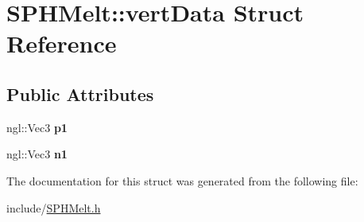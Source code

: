 \hypertarget{structSPHMelt_1_1vertData}{\section{S\-P\-H\-Melt\-:\-:vert\-Data Struct Reference}
\label{structSPHMelt_1_1vertData}
}
\subsection*{Public Attributes}
\begin{DoxyCompactItemize}
\item 
\hypertarget{structSPHMelt_1_1vertData_a894467b3cd0fa8acd65fe42f661af100}{ngl\-::\-Vec3 {\bfseries p1}}\label{structSPHMelt_1_1vertData_a894467b3cd0fa8acd65fe42f661af100}

\item 
\hypertarget{structSPHMelt_1_1vertData_a997efb17fe5ea13a89103af57bd6c5dc}{ngl\-::\-Vec3 {\bfseries n1}}\label{structSPHMelt_1_1vertData_a997efb17fe5ea13a89103af57bd6c5dc}

\end{DoxyCompactItemize}


The documentation for this struct was generated from the following file\-:\begin{DoxyCompactItemize}
\item 
include/\hyperlink{SPHMelt_8h}{S\-P\-H\-Melt.\-h}\end{DoxyCompactItemize}
